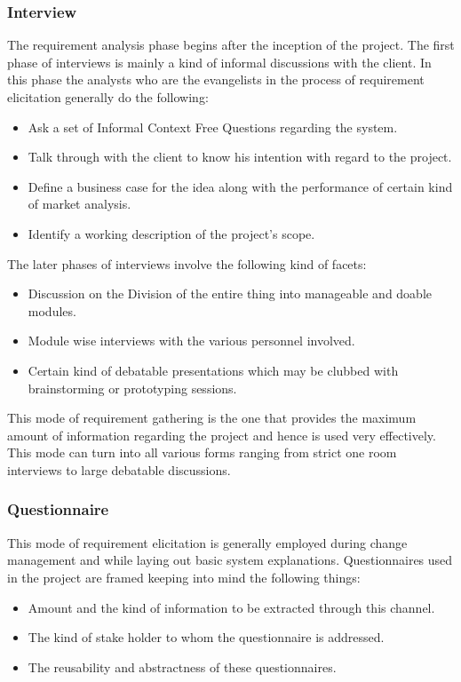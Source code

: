 \subsubsection{Interview}
The requirement analysis phase begins after the inception of the project.
The first phase of interviews is mainly a kind of informal discussions with the client. In this phase the analysts who are the evangelists in the process of requirement elicitation generally do the following:
\begin{itemize}
\item Ask a set of Informal  Context Free Questions regarding  the system.
\item Talk   through   with   the   client   to   know   his   intention   with   regard   to   the project.
\item Define  a  business  case  for  the  idea  along  with  the  performance  of  certain kind of market analysis.
\item Identify a working description of the project’s scope.
\end{itemize}
The later phases of interviews involve the following kind of facets:
\begin{itemize}
\item Discussion  on  the  Division  of  the  entire  thing  into  manageable  and  doable modules.
\item Module wise interviews with the various personnel  involved.
\item Certain   kind   of   debatable   presentations   which   may   be   clubbed   with brainstorming or prototyping  sessions.
\end{itemize}
This mode of requirement gathering is the one that provides the maximum amount of information regarding the  project and hence is used very effectively. This mode can turn into all various forms ranging from strict one room interviews to large debatable discussions.

\subsubsection{Questionnaire}
This mode of requirement elicitation is generally employed during change management and while laying out basic system explanations.
Questionnaires used in the project are framed keeping into mind the following things:
\begin{itemize}
\item Amount and the kind  of information to be extracted  through this     channel.
\item The kind of stake holder to whom the questionnaire is addressed.
\item The reusability and  abstractness of these questionnaires.
\end{itemize}
